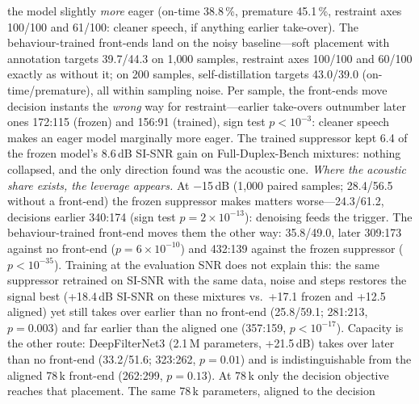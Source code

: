 \documentclass{article}
\begin{document}
the model slightly \emph{more} eager (on-time 38.8\,\%, premature 45.1\,\%, restraint axes
100/100 and 61/100: cleaner speech, if anything earlier take-over). The behaviour-trained
front-ends land on the noisy baseline---soft placement with
annotation targets 39.7/44.3 on 1{,}000 samples, restraint axes 100/100 and 60/100 exactly as
without it; on 200 samples, self-distillation targets 43.0/39.0
(on-time/premature), all within sampling noise. Per sample, the front-ends move decision instants the \emph{wrong} way for restraint---earlier take-overs outnumber later ones 172:115 (frozen) and 156:91 (trained), sign test $p<10^{-3}$: cleaner speech makes an eager model marginally more eager. The trained suppressor kept 6.4 of the frozen model's 8.6\,dB SI-SNR gain on Full-Duplex-Bench mixtures: nothing
collapsed, and the only direction found was the acoustic one. \emph{Where the acoustic share exists, the leverage appears.} At $-$15\,dB (1{,}000 paired
samples; 28.4/56.5 without a front-end) the frozen suppressor makes matters worse---24.3/61.2, decisions earlier 340:174 (sign test $p=2{\times}10^{-13}$): denoising feeds the trigger. The behaviour-trained front-end moves them the other way: 35.8/49.0, later 309:173 against no front-end ($p=6{\times}10^{-10}$) and 432:139 against the frozen suppressor ($p<10^{-35}$). Training at the evaluation SNR does not explain this: the same suppressor retrained on SI-SNR with the same data, noise and steps restores the signal best (+18.4\,dB SI-SNR on these mixtures vs.\ +17.1 frozen and +12.5 aligned) yet still takes over earlier than no front-end (25.8/59.1; 281:213, $p=0.003$) and far earlier than the aligned one (357:159, $p<10^{-17}$). Capacity is the other route: DeepFilterNet3 (2.1\,M parameters, +21.5\,dB) takes over later than no front-end (33.2/51.6; 323:262, $p=0.01$) and is indistinguishable from the aligned 78\,k front-end (262:299, $p=0.13$). At 78\,k only the decision objective reaches that placement. The same 78\,k parameters, aligned to the decision
\end{document}
